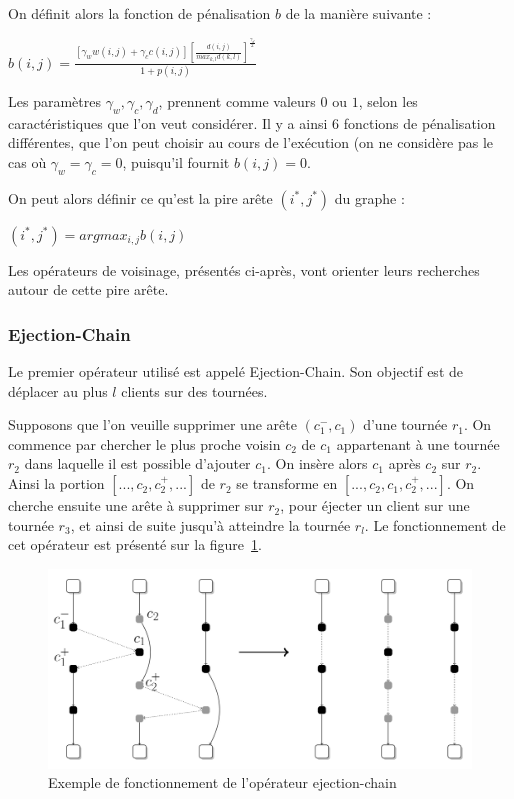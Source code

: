 \documentclass[a4paper,11pt]{article}%
\begin{document}
On définit alors la fonction de pénalisation $b$ de la manière suivante :
\begin{center}
$b(i,j) = \frac{[\gamma_w w(i,j) + \gamma_c c(i,j)] [\frac{d(i,j)}{max_{k,l}d(k,l)}] ^ {\frac{\gamma_d}{2}}}{1+p(i,j)}$
\end{center}

Les paramètres $\gamma_w,\gamma_c,\gamma_d$, prennent comme valeurs $0$ ou $1$, selon les caractéristiques que l'on veut considérer. 
Il y a ainsi 6 fonctions de pénalisation différentes, que l'on peut choisir au cours de l'exécution (on ne considère pas le cas où $\gamma_w = \gamma_c = 0$, puisqu'il fournit $b(i,j) = 0$.

On peut alors définir ce qu'est la pire arête $(i^*,j^*)$ du graphe :

\begin{center}
$ (i^*,j^*) = argmax_{i,j} b(i,j)$
\end{center}

Les opérateurs de voisinage, présentés ci-après, vont orienter leurs recherches autour de cette pire arête.
 
\subsubsection{Ejection-Chain}

Le premier opérateur utilisé est appelé Ejection-Chain. Son objectif est de déplacer au plus $l$ clients sur des tournées. 

Supposons que l'on veuille supprimer une arête $(c_1^-,c_1)$ d'une tournée $r_1$.
On commence par chercher le plus proche voisin $c_2$ de $c_1$ appartenant à une tournée $r_2$ dans laquelle il est possible d'ajouter $c_1$.
On insère alors $c_1$ après $c_2$ sur $r_2$. 
Ainsi la portion $[...,c_2,c_2^+,...]$ de $r_2$ se transforme en $[...,c_2,c_1,c_2^+,...]$.
On cherche ensuite une arête à supprimer sur $r_2$, pour éjecter un client sur une tournée $r_3$, et ainsi de suite jusqu'à atteindre la tournée $r_l$.
Le fonctionnement de cet opérateur est présenté sur la figure~\ref{EC}. 

\begin{figure}
\centering
\includegraphics[scale=0.2]{ejection_chain_big.png}
\caption{Exemple de fonctionnement de l'opérateur ejection-chain}
\label{EC}
\end{figure}
\end{document}
